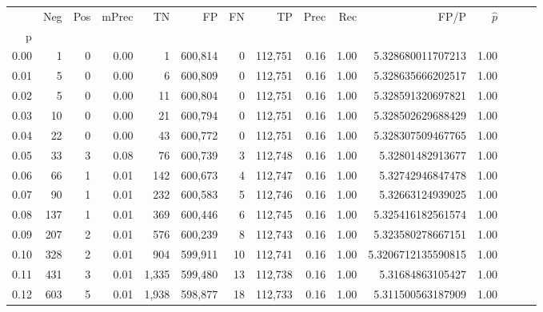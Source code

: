 \begin{tabular}{rrrrrrrrrrrrrrr}
\toprule
{} &     Neg &    Pos & mPrec &       TN &       FP &       FN &       TP &  Prec &   Rec &                    FP/P & $\hat{p}$ \\
p    &         &        &       &          &          &          &          &       &       &                         &           \\
\midrule
0.00 &       1 &      0 &  0.00 &        1 &  600,814 &        0 &  112,751 &  0.16 &  1.00 &       5.328680011707213 &      1.00 \\
0.01 &       5 &      0 &  0.00 &        6 &  600,809 &        0 &  112,751 &  0.16 &  1.00 &       5.328635666202517 &      1.00 \\
0.02 &       5 &      0 &  0.00 &       11 &  600,804 &        0 &  112,751 &  0.16 &  1.00 &       5.328591320697821 &      1.00 \\
0.03 &      10 &      0 &  0.00 &       21 &  600,794 &        0 &  112,751 &  0.16 &  1.00 &       5.328502629688429 &      1.00 \\
0.04 &      22 &      0 &  0.00 &       43 &  600,772 &        0 &  112,751 &  0.16 &  1.00 &       5.328307509467765 &      1.00 \\
0.05 &      33 &      3 &  0.08 &       76 &  600,739 &        3 &  112,748 &  0.16 &  1.00 &        5.32801482913677 &      1.00 \\
0.06 &      66 &      1 &  0.01 &      142 &  600,673 &        4 &  112,747 &  0.16 &  1.00 &        5.32742946847478 &      1.00 \\
0.07 &      90 &      1 &  0.01 &      232 &  600,583 &        5 &  112,746 &  0.16 &  1.00 &        5.32663124939025 &      1.00 \\
0.08 &     137 &      1 &  0.01 &      369 &  600,446 &        6 &  112,745 &  0.16 &  1.00 &       5.325416182561574 &      1.00 \\
0.09 &     207 &      2 &  0.01 &      576 &  600,239 &        8 &  112,743 &  0.16 &  1.00 &       5.323580278667151 &      1.00 \\
0.10 &     328 &      2 &  0.01 &      904 &  599,911 &       10 &  112,741 &  0.16 &  1.00 &      5.3206712135590815 &      1.00 \\
0.11 &     431 &      3 &  0.01 &    1,335 &  599,480 &       13 &  112,738 &  0.16 &  1.00 &        5.31684863105427 &      1.00 \\
0.12 &     603 &      5 &  0.01 &    1,938 &  598,877 &       18 &  112,733 &  0.16 &  1.00 &       5.311500563187909 &      1.00 \\

\end{tabular}
